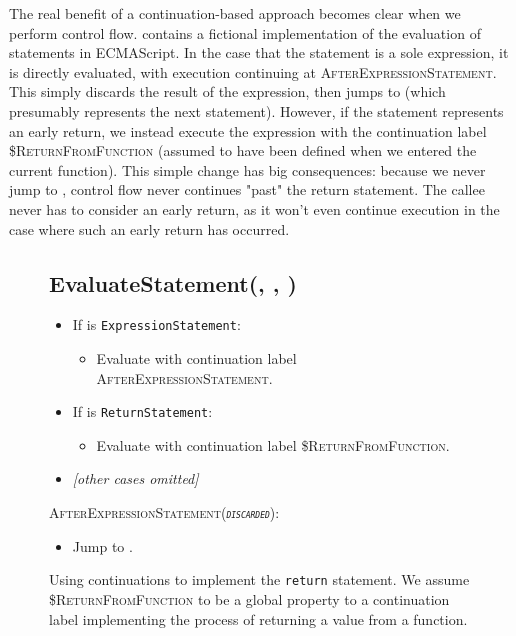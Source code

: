 The real benefit of a continuation-based approach becomes clear when we perform control flow.  contains a fictional implementation of the evaluation of statements in ECMAScript. In the case that the statement is a sole expression, it is directly evaluated, with execution continuing at \textsc{AfterExpressionStatement}. This simply discards the result of the expression, then jumps to  (which presumably represents the next statement). However, if the statement represents an early return, we instead execute the expression with the continuation label \textsc{\$ReturnFromFunction} (assumed to have been defined when we entered the current function). This simple change has big consequences: because we never jump to , control flow never continues "past" the return statement. The callee never has to consider an early return, as it won't even continue execution in the case where such an early return has occurred.\\

\begin{figure}
  \subsection*{EvaluateStatement(, , )}
  \begin{itemize}
    \item If  is \texttt{ExpressionStatement}:
    \begin{itemize}
      \item Evaluate  with continuation label \textsc{AfterExpressionStatement}.
    \end{itemize}
    \item If  is \texttt{ReturnStatement}:
    \begin{itemize}
      \item Evaluate  with continuation label \textsc{\$ReturnFromFunction}.
    \end{itemize}
    \item \textit{[other cases omitted]}
  \end{itemize}
\textsc{AfterExpressionStatement(\textit{\texttt{discarded}}):}
  \begin{itemize}
    \item Jump to .
  \end{itemize}
  \caption{Using continuations to implement the \texttt{return} statement. We assume \textsc{\$ReturnFromFunction} to be a global property to a continuation label implementing the process of returning a value from a function.}
  \label{fig:continuation_early_return}
\end{figure}

